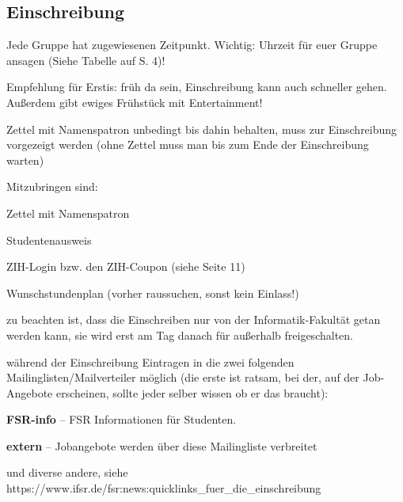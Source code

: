 \documentclass[a4paper,12pt]{report}
\begin{document}
\subsection{Einschreibung}
\begin{itemize*}
	\item Jede Gruppe hat zugewiesenen Zeitpunkt. Wichtig: Uhrzeit für euer Gruppe ansagen (Siehe Tabelle auf S. 4)!
	\item Empfehlung für Erstis: früh da sein, Einschreibung kann auch schneller gehen. Außerdem gibt ewiges Frühstück mit Entertainment!
	\item Zettel mit Namenspatron unbedingt bis dahin behalten, muss zur Einschreibung vorgezeigt werden (ohne Zettel muss man bis zum Ende der Einschreibung warten)
	\item Mitzubringen sind:
		\begin{itemize*}
		\item Zettel mit Namenspatron
		\item Studentenausweis
		\item ZIH-Login bzw. den ZIH-Coupon (siehe Seite 11)
		\item Wunschstundenplan (vorher raussuchen, sonst kein Einlass!)
		\item zu beachten ist, dass die Einschreiben nur von der Informatik-Fakultät getan werden kann, sie wird erst am Tag danach für außerhalb freigeschalten.
	\end{itemize*}
	\item während der Einschreibung Eintragen in die zwei folgenden Mailinglisten/Mailverteiler möglich (die erste ist ratsam, bei der, auf der Job-Angebote erscheinen, sollte jeder selber wissen ob er das braucht):
		\begin{itemize*}
		\item \textbf{FSR-info} -- FSR Informationen für Studenten.
		\item \textbf{extern} -- Jobangebote werden über diese Mailingliste verbreitet
		\item und diverse andere, siehe \\ https://www.ifsr.de/fsr:news:quicklinks\_fuer\_die\_einschreibung
	\end{itemize*}
\end{itemize*}
\end{document}
